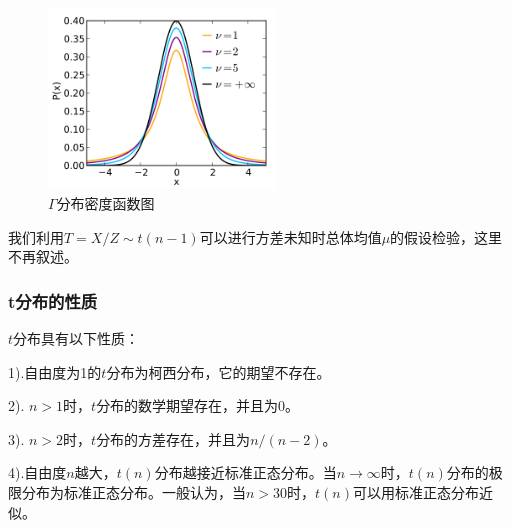            \begin{figure}[H]
           \centering
           \includegraphics[width=6cm]{images/T_distribution_density_func.png}
           \caption{$\Gamma$分布密度函数图}
           \label{fig:T分布密度函数图}
           \end{figure}
        我们利用$T = X/Z\sim t(n-1)$可以进行方差未知时总体均值$\mu$的假设检验，这里不再叙述。
        \subsubsection{t分布的性质}
            $t$分布具有以下性质：
            \par
            1).自由度为1的$t$分布为柯西分布，它的期望不存在。
            \par
            2). $n>1$时，$t$分布的数学期望存在，并且为0。
            \par
            3). $n>2$时，$t$分布的方差存在，并且为$n/(n-2)$。
            \par
            4).自由度$n$越大，$t(n)$分布越接近标准正态分布。当$n\rightarrow \infty$时，$t(n)$分布的极限分布为标准正态分布。一般认为，当$n>30$时，$t(n)$可以用标准正态分布近似。
